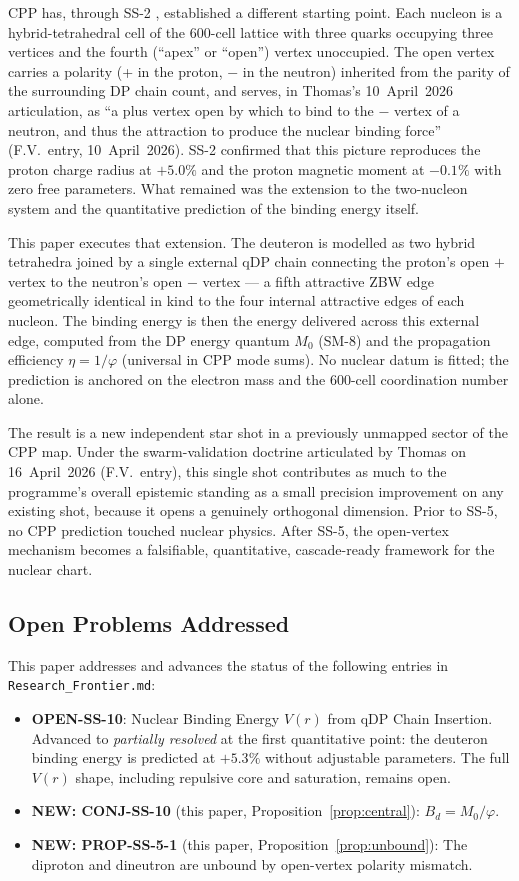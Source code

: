 \documentclass[11pt,letterpaper]{article}
\newcommand{\phig}{\varphi}
\newcommand{\Mzero}{M_0}
\newcommand{\Bd}{B_{d}}
\begin{document}
CPP has, through SS-2 \citep{abshier2026ss2}, established a different starting point. Each nucleon is a hybrid-tetrahedral cell of the 600-cell lattice with three quarks occupying three vertices and the fourth (``apex'' or ``open'') vertex unoccupied. The open vertex carries a polarity (+ in the proton, $-$ in the neutron) inherited from the parity of the surrounding DP chain count, and serves, in Thomas's 10~April~2026 articulation, as ``a plus vertex open by which to bind to the $-$ vertex of a neutron, and thus the attraction to produce the nuclear binding force'' (F.V.\ entry, 10~April~2026). SS-2 confirmed that this picture reproduces the proton charge radius at $+5.0\%$ and the proton magnetic moment at $-0.1\%$ with zero free parameters. What remained was the extension to the two-nucleon system and the quantitative prediction of the binding energy itself.

This paper executes that extension. The deuteron is modelled as two hybrid tetrahedra joined by a single external qDP chain connecting the proton's open $+$ vertex to the neutron's open $-$ vertex --- a fifth attractive ZBW edge geometrically identical in kind to the four internal attractive edges of each nucleon. The binding energy is then the energy delivered across this external edge, computed from the DP energy quantum $\Mzero$ (SM-8) and the propagation efficiency $\eta = 1/\phig$ (universal in CPP mode sums). No nuclear datum is fitted; the prediction is anchored on the electron mass and the 600-cell coordination number alone.

The result is a new independent star shot in a previously unmapped sector of the CPP map. Under the swarm-validation doctrine articulated by Thomas on 16~April~2026 (F.V.\ entry), this single shot contributes as much to the programme's overall epistemic standing as a small precision improvement on any existing shot, because it opens a genuinely orthogonal dimension. Prior to SS-5, no CPP prediction touched nuclear physics. After SS-5, the open-vertex mechanism becomes a falsifiable, quantitative, cascade-ready framework for the nuclear chart.

\subsection{Open Problems Addressed}
\label{sec:open_problems}

This paper addresses and advances the status of the following entries in \verb|Research_Frontier.md|:
\begin{itemize}
\item \textbf{OPEN-SS-10}: Nuclear Binding Energy $V(r)$ from qDP Chain Insertion. Advanced to \emph{partially resolved} at the first quantitative point: the deuteron binding energy is predicted at $+5.3\%$ without adjustable parameters. The full $V(r)$ shape, including repulsive core and saturation, remains open.
\item \textbf{NEW: CONJ-SS-10} (this paper, Proposition~\ref{prop:central}): $\Bd = \Mzero/\phig$.
\item \textbf{NEW: PROP-SS-5-1} (this paper, Proposition~\ref{prop:unbound}): The diproton and dineutron are unbound by open-vertex polarity mismatch.
\end{itemize}
\end{document}
